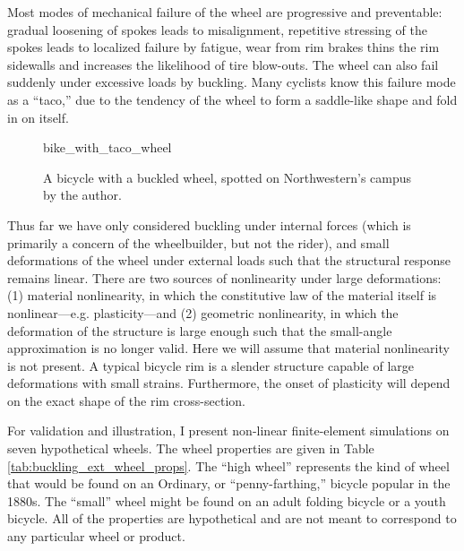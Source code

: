 \documentclass[\rootdir/thesis.tex]{subfiles}
\begin{document}
Most modes of mechanical failure of the wheel are progressive and preventable: gradual loosening of spokes leads to misalignment, repetitive stressing of the spokes leads to localized failure by fatigue, wear from rim brakes thins the rim sidewalls and increases the likelihood of tire blow-outs. The wheel can also fail suddenly under excessive loads by buckling. Many cyclists know this failure mode as a ``taco,'' due to the tendency of the wheel to form a saddle-like shape and fold in on itself.

\begin{figure}
\centering
{bike_with_taco_wheel}
\caption{A bicycle with a buckled wheel, spotted on Northwestern's campus by the author.}
\label{fig:bike_taco_wheel}
\end{figure}

Thus far we have only considered buckling under internal forces (which is primarily a concern of the wheelbuilder, but not the rider), and small deformations of the wheel under external loads such that the structural response remains linear. There are two sources of nonlinearity under large deformations: (1) material nonlinearity, in which the constitutive law of the material itself is nonlinear---e.g. plasticity---and (2) geometric nonlinearity, in which the deformation of the structure is large enough such that the small-angle approximation is no longer valid. Here we will assume that material nonlinearity is not present. A typical bicycle rim is a slender structure capable of large deformations with small strains. Furthermore, the onset of plasticity will depend on the exact shape of the rim cross-section.

For validation and illustration, I present non-linear finite-element simulations on seven hypothetical wheels. The wheel properties are given in Table \ref{tab:buckling_ext_wheel_props}. The ``high wheel'' represents the kind of wheel that would be found on an Ordinary, or ``penny-farthing,'' bicycle popular in the 1880s. The ``small'' wheel might be found on an adult folding bicycle or a youth bicycle. All of the properties are hypothetical and are not meant to correspond to any particular wheel or product.
\end{document}
